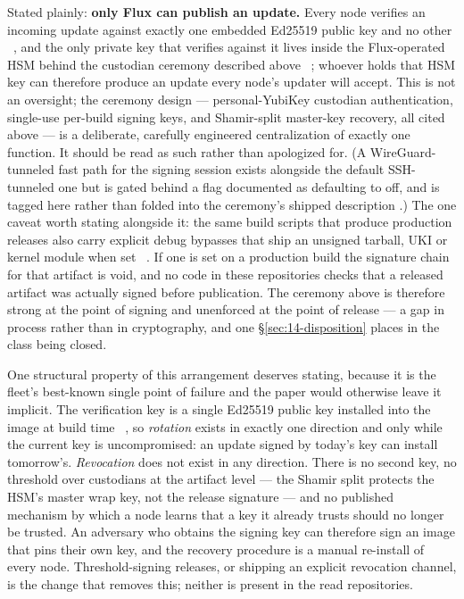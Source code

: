 Stated plainly: \textbf{only Flux can publish an \ArcaneOS update.} Every node verifies an incoming
update against exactly one embedded Ed25519 public key and no other
\shipped~, and the only private key that
verifies against it lives inside the Flux-operated HSM behind the custodian ceremony described
above \shipped~; whoever holds
that HSM key can therefore produce an update every node's updater will accept. This is not an
oversight; the ceremony design — personal-YubiKey custodian authentication, single-use per-build
signing keys, and Shamir-split master-key recovery, all cited above — is a deliberate, carefully
engineered centralization of exactly one function. It should be read as such rather than
apologized for. (A WireGuard-tunneled fast path for the signing session exists alongside the
default SSH-tunneled one but is gated behind a flag documented as defaulting to off, and is tagged
\inprogress here rather than folded into the ceremony's shipped description
.) The
one caveat worth stating alongside it: the same build scripts that produce production releases also
carry explicit debug bypasses that ship an unsigned tarball, UKI or kernel module when set
\shipped~. If one is set on a production build the signature chain for that artifact is void, and no
code in these repositories checks that a released artifact was actually signed before publication.
The ceremony above is therefore strong at the point of signing and unenforced at the point of
release --- a gap in process rather than in cryptography, and one \S\ref{sec:14-disposition}
places in the class being closed.

One structural property of this arrangement deserves stating, because it is the fleet's
best-known single point of failure and the paper would otherwise leave it implicit. The verification
key is a single Ed25519 public key installed into the image at build time
\shipped~, so
\emph{rotation} exists in exactly one direction and only while the current key is uncompromised: an
update signed by today's key can install tomorrow's. \emph{Revocation} does not exist in any
direction. There is no second key, no threshold over custodians at the artifact level --- the Shamir
split protects the HSM's master wrap key, not the release signature --- and no published mechanism
by which a node learns that a key it already trusts should no longer be trusted. An adversary who
obtains the signing key can therefore sign an image that pins their own key, and the recovery
procedure is a manual re-install of every node. Threshold-signing releases, or shipping an explicit
revocation channel, is the change that removes this; neither is present in the read repositories.

